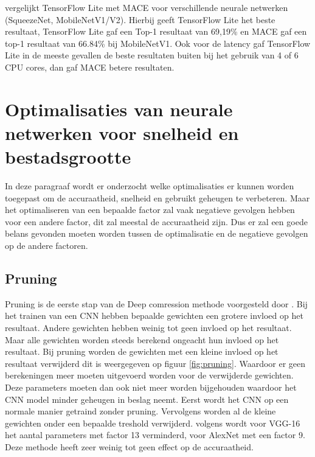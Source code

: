 \cite{febvay_low-level_2020} vergelijkt TensorFlow Lite met MACE voor verschillende neurale netwerken (SqueezeNet, MobileNetV1/V2).
Hierbij geeft TensorFlow Lite het beste resultaat, TensorFlow Lite gaf een Top-1 resultaat van 69,19\% en MACE gaf een top-1 resultaat van 66.84\% bij MobileNetV1.
Ook voor de latency gaf TensorFlow Lite in de meeste gevallen de beste resultaten buiten bij het gebruik van 4 of 6 CPU cores, dan gaf MACE betere resultaten.  

\section{Optimalisaties van neurale netwerken voor snelheid en bestadsgrootte}
In deze paragraaf wordt er onderzocht welke optimalisaties er kunnen worden toegepast om de accuraatheid, snelheid en gebruikt geheugen te verbeteren.
Maar het optimaliseren van een bepaalde factor zal vaak negatieve gevolgen hebben voor een andere factor, dit zal meestal de accuraatheid zijn.
Dus er zal een goede belans gevonden moeten worden tussen de optimalisatie en de negatieve gevolgen op de andere factoren.


\subsection{Pruning}
Pruning is de eerste stap van de Deep comression methode voorgesteld door \cite{han_deep_2016}.
Bij het trainen van een CNN hebben bepaalde gewichten een grotere invloed op het resultaat.
Andere gewichten hebben weinig tot geen invloed op het resultaat.
Maar alle gewichten worden steeds berekend ongeacht hun invloed op het resultaat.
Bij pruning worden de gewichten met een kleine invloed op het resultaat verwijderd dit is weergegeven op figuur \ref{fig:pruning}. 
Waardoor er geen berekeningen meer moeten uitgevoerd worden voor de verwijderde gewichten.
Deze parameters moeten dan ook niet meer worden bijgehouden waardoor het CNN model minder geheugen in beslag neemt.
Eerst wordt het CNN op een normale manier getraind zonder pruning.
Vervolgens worden al de kleine gewichten onder een bepaalde treshold verwijderd.
volgens \cite{han_deep_2016} wordt voor VGG-16 het aantal parameters met factor 13 verminderd, voor AlexNet met een factor 9.
Deze methode heeft zeer weinig tot geen effect op de accuraatheid.

